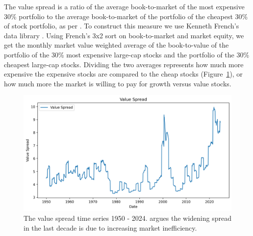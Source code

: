 The value spread is a ratio of the average book-to-market of the most expensive 30\% portfolio to the average book-to-market of the portfolio of the cheapest 30\% of stock portfolio, as per \citet{fama_french_1993}.
To construct this measure we use Kenneth French's data library \citep{french_website}. 
Using French's 3x2 sort on book-to-market and market equity, we get the monthly market value weighted average of the book-to-value of the portfolio of the 30\% most expensive large-cap stocks and the portfolio of the 30\% cheapest large-cap stocks.
Dividing the two averages represents how much more expensive the expensive stocks are compared to the cheap stocks (Figure~\ref{fig:value_spread}), or how much more the market is willing to pay for growth versus value stocks.

\begin{figure}[h!]
    \centering
    \includegraphics[width=1\textwidth]{../figs/Value Spread.png}
    \caption{The value spread time series 1950 - 2024. \citet{asness_2024} argues the widening spread in the last decade is due to increasing market inefficiency.}
    \label{fig:value_spread}
\end{figure}